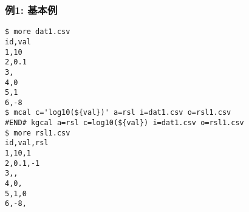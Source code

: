 \subsubsection*{例1: 基本例}



\begin{Verbatim}[baselinestretch=0.7,frame=single]
$ more dat1.csv
id,val
1,10
2,0.1
3,
4,0
5,1
6,-8
$ mcal c='log10(${val})' a=rsl i=dat1.csv o=rsl1.csv
#END# kgcal a=rsl c=log10(${val}) i=dat1.csv o=rsl1.csv
$ more rsl1.csv
id,val,rsl
1,10,1
2,0.1,-1
3,,
4,0,
5,1,0
6,-8,
\end{Verbatim}

